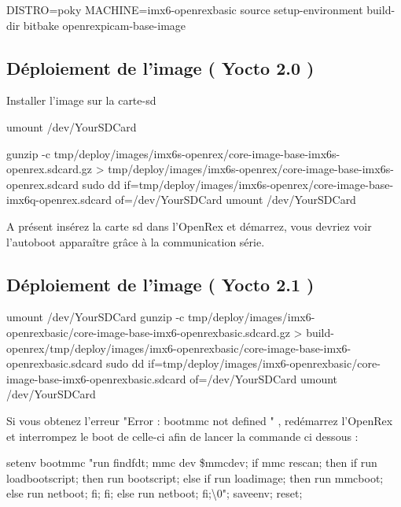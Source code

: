 	\begin{tcolorbox}DISTRO=poky MACHINE=imx6-openrexbasic source setup-environment build-dir
		bitbake openrexpicam-base-image
	\end{tcolorbox}

	\subsection{Déploiement de l’image ( Yocto 2.0 )}

	Installer l’image sur la carte-sd

	\begin{tcolorbox}
		umount /dev/YourSDCard

		gunzip -c tmp/deploy/images/imx6s-openrex/core-image-base-imx6s-openrex.sdcard.gz > tmp/deploy/images/imx6s-openrex/core-image-base-imx6s-openrex.sdcard
		sudo dd if=tmp/deploy/images/imx6s-openrex/core-image-base-imx6q-openrex.sdcard of=/dev/YourSDCard
		umount /dev/YourSDCard
	\end{tcolorbox}

	A présent insérez la carte sd dans l’OpenRex et démarrez, vous devriez voir l’autoboot apparaître grâce à la communication série.

	\subsection{Déploiement de l’image ( Yocto 2.1 )}

	\begin{tcolorbox}
		umount /dev/YourSDCard
		gunzip -c tmp/deploy/images/imx6-openrexbasic/core-image-base-imx6-openrexbasic.sdcard.gz > build-openrex/tmp/deploy/images/imx6-openrexbasic/core-image-base-imx6-openrexbasic.sdcard
		sudo dd if=tmp/deploy/images/imx6-openrexbasic/core-image-base-imx6-openrexbasic.sdcard of=/dev/YourSDCard
		umount /dev/YourSDCard
	\end{tcolorbox}

	Si vous obtenez l’erreur "Error : bootmmc not defined " , redémarrez l’OpenRex et interrompez le boot de celle-ci afin de lancer la commande ci dessous :

	\begin{tcolorbox}
		setenv bootmmc "run findfdt; mmc dev \${mmcdev}; if mmc rescan; then if run loadbootscript;
		then run bootscript; else if run loadimage; then run mmcboot; else run netboot;
		fi; fi; else run netboot; fi;\textbackslash0"; saveenv; reset;
	\end{tcolorbox}

